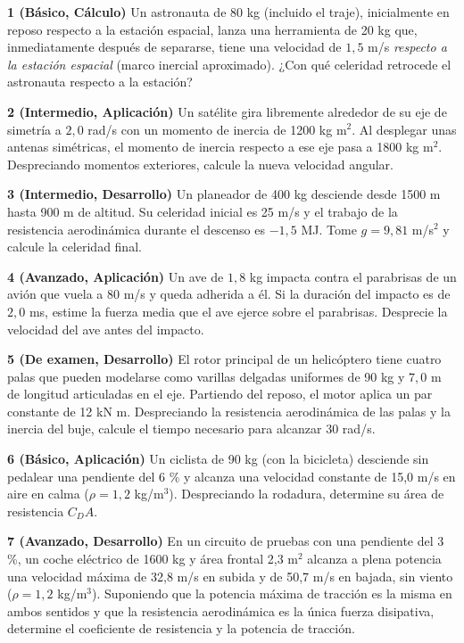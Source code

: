\documentclass[10pt,openany]{book}
\begin{document}
\begin{tcolorbox}[title={Ejercicios propuestos}, studiumworked, breakable]

\noindent\textbf{1 (Básico, Cálculo)}
Un astronauta de 80 kg (incluido el traje), inicialmente en reposo respecto a la estación espacial, lanza una herramienta de 20 kg que, inmediatamente después de separarse, tiene una velocidad de \(1{,}5\) m/s \emph{respecto a la estación espacial} (marco inercial aproximado). ¿Con qué celeridad retrocede el astronauta respecto a la estación?

\noindent\textbf{2 (Intermedio, Aplicación)}
Un satélite gira libremente alrededor de su eje de simetría a \(2{,}0\) rad/s con un momento de inercia de 1200 kg m\(^2\). Al desplegar unas antenas simétricas, el momento de inercia respecto a ese eje pasa a 1800 kg m\(^2\). Despreciando momentos exteriores, calcule la nueva velocidad angular.

\noindent\textbf{3 (Intermedio, Desarrollo)}
Un planeador de 400 kg desciende desde 1500 m hasta 900 m de altitud. Su celeridad inicial es 25 m/s y el trabajo de la resistencia aerodinámica durante el descenso es \(-1{,}5\) MJ. Tome \(g = 9{,}81\) m/s\(^2\) y calcule la celeridad final.

\noindent\textbf{4 (Avanzado, Aplicación)}
Un ave de \(1{,}8\) kg impacta contra el parabrisas de un avión que vuela a 80 m/s y queda adherida a él. Si la duración del impacto es de \(2{,}0\) ms, estime la fuerza media que el ave ejerce sobre el parabrisas. Desprecie la velocidad del ave antes del impacto.

\noindent\textbf{5 (De examen, Desarrollo)}
El rotor principal de un helicóptero tiene cuatro palas que pueden modelarse como varillas delgadas uniformes de 90 kg y \(7{,}0\) m de longitud articuladas en el eje. Partiendo del reposo, el motor aplica un par constante de 12 kN m. Despreciando la resistencia aerodinámica de las palas y la inercia del buje, calcule el tiempo necesario para alcanzar 30 rad/s.

\noindent\textbf{6 (Básico, Aplicación)}
Un ciclista de 90 kg (con la bicicleta) desciende sin pedalear una pendiente del 6 \% y alcanza una velocidad constante de 15,0 m/s en aire en calma (\(\rho = 1{,}2\) kg/m\(^3\)). Despreciando la rodadura, determine su área de resistencia \(C_D A\).

\noindent\textbf{7 (Avanzado, Desarrollo)}
En un circuito de pruebas con una pendiente del 3 \%, un coche eléctrico de 1600 kg y área frontal 2,3 m\(^2\) alcanza a plena potencia una velocidad máxima de 32,8 m/s en subida y de 50,7 m/s en bajada, sin viento (\(\rho = 1{,}2\) kg/m\(^3\)). Suponiendo que la potencia máxima de tracción es la misma en ambos sentidos y que la resistencia aerodinámica es la única fuerza disipativa, determine el coeficiente de resistencia y la potencia de tracción.


\end{tcolorbox}
\end{document}
